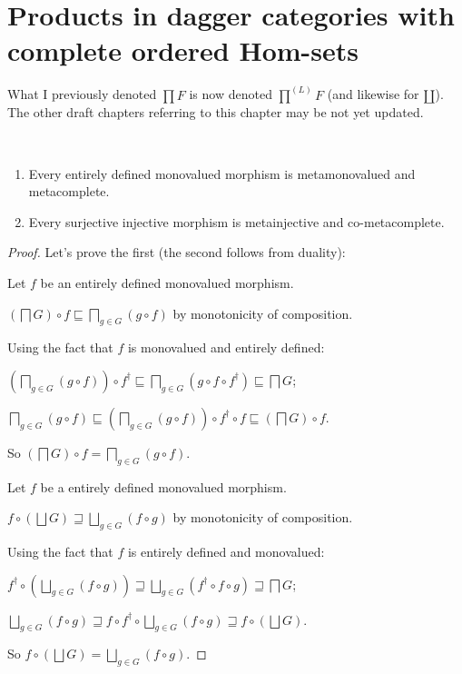 \chapter{Products in dagger categories with complete ordered Hom-sets}


\begin{note}
  What I previously denoted $\prod F$ is now denoted $\prod^{(L)} F$ (and
  likewise for $\mathord{\coprod}$). The other draft chapters referring to
  this chapter may be not yet updated.
\end{note}

\begin{prop}
  ~
  \begin{enumerate}
    \item Every entirely defined monovalued morphism is metamonovalued and metacomplete.
    \item Every surjective injective morphism is metainjective and co-metacomplete.
  \end{enumerate}

\end{prop}

\begin{proof}
Let's prove the first (the second follows from duality):
  
Let $f$ be an entirely defined monovalued morphism.

$\left( \bigsqcap G \right) \circ f \sqsubseteq \bigsqcap_{g \in G} (g \circ
f)$ by monotonicity of composition.

Using the fact that $f$ is monovalued and entirely defined:

$\left( \bigsqcap_{g \in G} (g \circ f) \right) \circ f^{\dagger} \sqsubseteq
\bigsqcap_{g \in G} (g \circ f \circ f^{\dagger}) \sqsubseteq \bigsqcap G$;

$\bigsqcap_{g \in G} (g \circ f) \sqsubseteq \left( \bigsqcap_{g \in G} (g
\circ f) \right) \circ f^{\dagger} \circ f \sqsubseteq \left( \bigsqcap G
\right) \circ f$.

So $\left( \bigsqcap G \right) \circ f = \bigsqcap_{g \in G} (g \circ f)$.

Let $f$ be a entirely defined monovalued morphism.

$f \circ \left( \bigsqcup G \right) \sqsupseteq \bigsqcup_{g \in G} (f \circ
g)$ by monotonicity of composition.

Using the fact that $f$ is entirely defined and monovalued:

$f^{\dagger} \circ \left( \bigsqcup_{g \in G} (f \circ g) \right) \sqsupseteq
\bigsqcup_{g \in G} (f^{\dagger} \circ f \circ g) \sqsupseteq \bigsqcap G$;

$\bigsqcup_{g \in G} (f \circ g) \sqsupseteq f \circ f^{\dagger} \circ
\bigsqcup_{g \in G} (f \circ g) \sqsupseteq f \circ \left( \bigsqcup G
\right)$.

So $f \circ \left( \bigsqcup G \right) = \bigsqcup_{g \in G} (f \circ g)$.
\end{proof}

